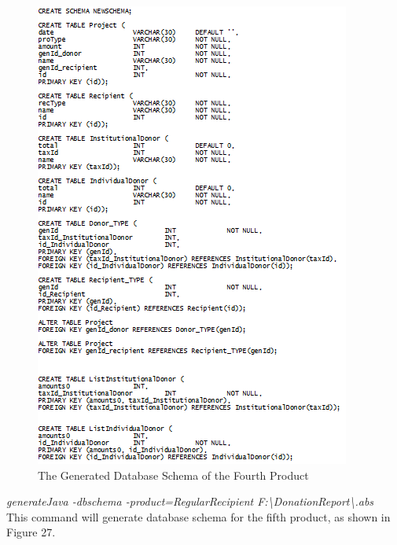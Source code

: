 \documentclass[runningheads,a4paper]{llncs}
\begin{document}
\begin{figure}
	\centering
	\includegraphics[scale=0.9]{create4.png}
	\caption{The Generated Database Schema of the Fourth Product}
	\label{Figure 26}
\end{figure}

\emph{generateJava -dbschema -product=RegularRecipient F:\textbackslash DonationReport\textbackslash *.abs}\\

This command will generate database schema for the fifth product, as shown in Figure 27.\\
\end{document}
